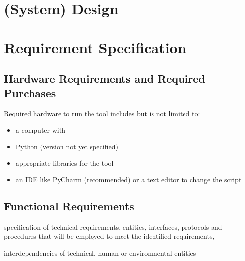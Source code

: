 \chapter{(System) Design}
\label{chp:design}

\chapter{Requirement Specification}
\label{chp:specification}

\section{Hardware Requirements and Required Purchases}
\label{chp:hardware-purchases}


Required hardware to run the tool includes but is not limited to:
\begin{itemize}
	\item a computer with
	\item Python (version not yet specified)
	\item appropriate libraries for the tool
	\item an IDE like PyCharm (recommended) or a text editor to change the script
\end{itemize}


\section{Functional Requirements}
\label{chp:functional}


\begin{shaded}
\noindent
specification of technical requirements, entities, interfaces, protocols and procedures that will be employed to meet the identified requirements,

\medskip
\noindent
interdependencies of technical, human or environmental entities
\end{shaded}




